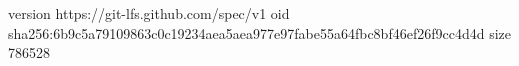 version https://git-lfs.github.com/spec/v1
oid sha256:6b9c5a79109863c0c19234aea5aea977e97fabe55a64fbc8bf46ef26f9cc4d4d
size 786528
